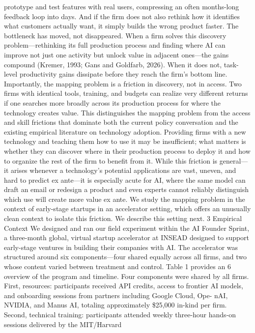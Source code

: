 prototype and test features with real users, compressing an often months-long feedback loop into
days. And if the firm does not also rethink how it identifies what customers actually want, it simply
builds the wrong product faster. The bottleneck has moved, not disappeared. When a firm solves
this discovery problem—rethinking its full production process and finding where AI can improve
not just one activity but unlock value in adjacent ones—the gains compound (Kremer, 1993; Gans
and Goldfarb, 2026). When it does not, task-level productivity gains dissipate before they reach
the firm’s bottom line.
Importantly, the mapping problem is a friction in discovery, not in access.
Two firms with
identical tools, training, and budgets can realize very different returns if one searches more broadly
across its production process for where the technology creates value. This distinguishes the mapping
problem from the access and skill frictions that dominate both the current policy conversation and
the existing empirical literature on technology adoption. Providing firms with a new technology
and teaching them how to use it may be insufficient; what matters is whether they can discover
where in their production process to deploy it and how to organize the rest of the firm to benefit
from it. While this friction is general—it arises whenever a technology’s potential applications are
vast, uneven, and hard to predict ex ante—it is especially acute for AI, where the same model can
draft an email or redesign a product and even experts cannot reliably distinguish which use will
create more value ex ante.
We study the mapping problem in the context of early-stage startups in an accelerator setting,
which offers an unusually clean context to isolate this friction. We describe this setting next.
3
Empirical Context
We designed and ran our field experiment within the AI Founder Sprint, a three-month global,
virtual startup accelerator at INSEAD designed to support early-stage ventures in building their
companies with AI. The accelerator was structured around six components—four shared equally
across all firms, and two whose content varied between treatment and control. Table 1 provides an
6
overview of the program and timeline.
Four components were shared by all firms. First, resources: participants received API credits,
access to frontier AI models, and onboarding sessions from partners including Google Cloud, Ope-
nAI, NVIDIA, and Manus AI, totaling approximately \$25,000 in-kind per firm. Second, technical
training: participants attended weekly three-hour hands-on sessions delivered by the MIT/Harvard
